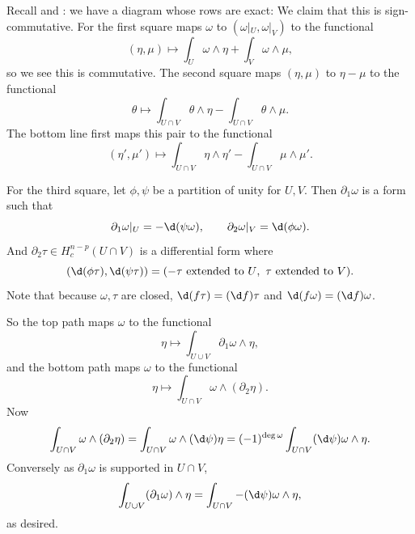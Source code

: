 Recall  and : we have a diagram whose rows are exact:
{\def\diagcolwidth{0cm}%
\def\diagcolbuf{-8pt}%
}
We claim that this is sign-commutative.
For the first square maps $\omega$ to $(\omega|_U,\omega|_V)$ to the functional
$$ (\eta,\mu) \mapsto \int_U\omega\wedge\eta + \int_V\omega\wedge\mu , $$
so we see this is commutative.
The second square maps $(\eta,\mu)$ to $\eta-\mu$ to the functional
$$ \theta\mapsto \int_{U\cap V}\theta\wedge\eta - \int_{U\cap V}\theta\wedge\mu . $$
The bottom line first maps this pair to the functional
$$ (\eta',\mu') \mapsto \int_{U\cap V}\eta\wedge\eta' - \int_{U\cap V}\mu\wedge\mu' . $$

For the third square, let $\phi,\psi$ be a partition of unity for $U,V$.
Then $\partial_1\omega$ is a form such that
$$ \partial_1\omega|_U = -\d(\psi\omega),\qquad \partial_2\omega|_V = \d(\phi\omega) . $$
And $\partial_2\tau\in H^{n-p}_c(U\cap V)$ is a differential form where
$$ (\d(\phi\tau),\d(\psi\tau)) = (-\tau\text{ extended to $U$},\ \tau\text{ extended to $V$}) . $$
Note that because $\omega,\tau$ are closed, $\d(f\tau)=(\d f)\tau$ and $\d(f\omega)=(\d f)\omega$.

So the top path maps $\omega$ to the functional
$$ \eta \mapsto \int_{U\cup V}\partial_1\omega\wedge\eta , $$
and the bottom path maps $\omega$ to the functional
$$ \eta \mapsto \int_{U\cap V}\omega\wedge(\partial_2\eta). $$
Now
$$ \int_{U\cap V}\omega\wedge(\partial_2\eta) = \int_{U\cap V}\omega\wedge(\d\psi)\eta
= (-1)^{\deg\omega}\int_{U\cap V}(\d\psi)\omega\wedge\eta . $$
Conversely as $\partial_1\omega$ is supported in $U\cap V$,
$$ \int_{U\cup V}(\partial_1\omega)\wedge\eta = \int_{U\cap V}-(\d\psi)\omega\wedge\eta , $$
as desired.

